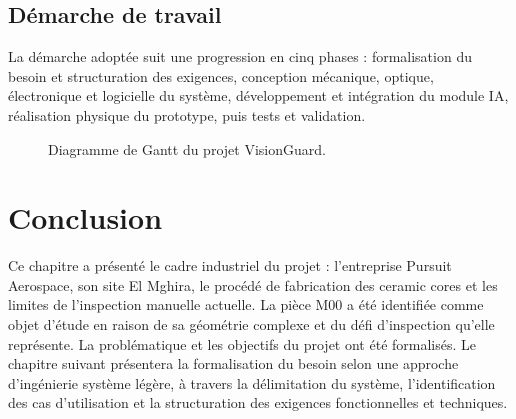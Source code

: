 \subsection*{Démarche de travail}
La démarche adoptée suit une progression en cinq phases : formalisation du besoin et
structuration des exigences, conception mécanique, optique, électronique et logicielle
du système, développement et intégration du module IA, réalisation physique du prototype,
puis tests et validation.

\begin{figure}[H]
\centering
{}
\caption{Diagramme de Gantt du projet VisionGuard.}
\label{fig:gantt}
\end{figure}

\section{Conclusion}
Ce chapitre a présenté le cadre industriel du projet : l'entreprise Pursuit Aerospace,
son site El Mghira, le procédé de fabrication des ceramic cores et les limites de
l'inspection manuelle actuelle. La pièce M00 a été identifiée comme objet d'étude en
raison de sa géométrie complexe et du défi d'inspection qu'elle représente. La
problématique et les objectifs du projet ont été formalisés. Le chapitre suivant
présentera la formalisation du besoin selon une approche d'ingénierie système légère,
à travers la délimitation du système, l'identification des cas d'utilisation et la
structuration des exigences fonctionnelles et techniques.